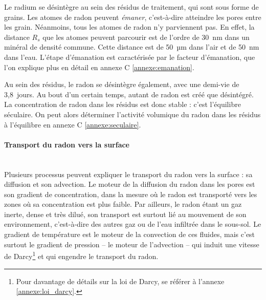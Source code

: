 \documentclass{article}
\begin{document}
Le radium se désintègre au sein des résidus de traitement, qui sont sous forme de grains. Les atomes de radon peuvent \emph{émaner}, c'est-à-dire atteindre les pores entre les grain. Néanmoins, tous les atomes de radon n'y parviennent pas. En effet, la distance $R_s$ que les atomes peuvent parcourir est de l’ordre de 30~nm dans un minéral de densité commune. Cette distance est de 50~µm dans l’air et de 50~nm dans l’eau. L'étape d'émanation est caractérisée par le facteur d'émanation, que l'on explique plus en détail en annexe C \ref{annexe:emanation}.

Au sein des résidus, le radon se désintègre également, avec une demi-vie de 3,8~jours. Au bout d’un certain temps, autant de radon est créé que désintégré. La concentration de radon dans les résidus est donc stable : c’est l’équilibre séculaire. On peut alors déterminer l'activité volumique du radon dans les résidus à l'équilibre en annexe C \ref{annexe:seculaire}.

\paragraph{Transport du radon vers la surface \\ \\} Plusieurs processus peuvent expliquer le transport du radon vers la surface \cite{irsn_ineris_radon_nodate} : sa diffusion et son advection. Le moteur de la diffusion du radon dans les pores est son gradient de concentration, dans la mesure où le radon est transporté vers les zones où sa concentration est plus faible. Par ailleurs, le radon étant un gaz inerte, dense et très dilué, son transport est surtout lié au mouvement de son environnement, c’est-à-dire des autres gaz ou de l’eau infiltrée dans le sous-sol. Le gradient de température est le moteur de la convection de ces fluides, mais c’est surtout le gradient de pression -- le moteur de l’advection -- qui induit une vitesse de Darcy\footnote{Pour davantage de détails sur la loi de Darcy, se référer à l'annexe \ref{annexe:loi_darcy}.} et qui engendre le transport du radon.
\end{document}
